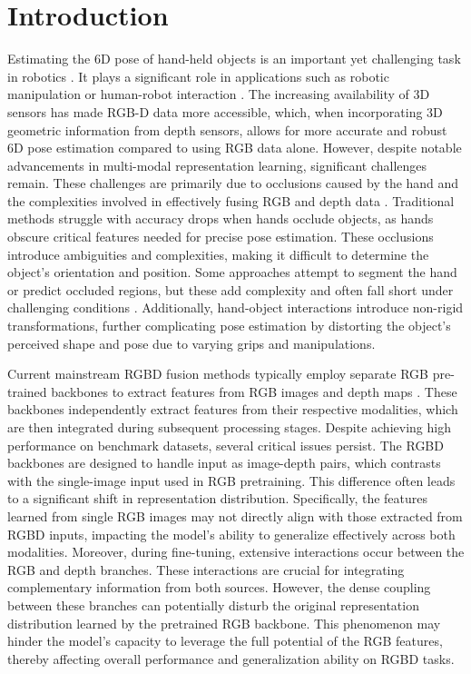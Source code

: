 \section{Introduction}
\label{sec:intro}

Estimating the 6D pose of hand-held objects is an important yet challenging task in robotics \cite{pfanne2018fusing, anzai2020deep}. It plays a significant role in applications such as robotic manipulation or human-robot interaction \cite{andrychowicz2020learning, handa2020dexpilot}. The increasing availability of 3D sensors has made RGB-D data more accessible, which, when incorporating 3D geometric information from depth sensors, allows for more accurate and robust 6D pose estimation compared to using RGB data alone. However, despite notable advancements in multi-modal representation learning, significant challenges remain. These challenges are primarily due to occlusions caused by the hand and the complexities involved in effectively fusing RGB and depth data \cite{chao2021dexycb}. Traditional methods \cite{wang20216d, peng2019pvnet, wang2019densefusion} struggle with accuracy drops when hands occlude objects, as hands obscure critical features needed for precise pose estimation. These occlusions introduce ambiguities and complexities, making it difficult to determine the object's orientation and position. Some approaches attempt to segment the hand or predict occluded regions, but these add complexity and often fall short under challenging conditions \cite{he2020pvn3d, castro2023crt}. Additionally, hand-object interactions introduce non-rigid transformations, further complicating pose estimation by distorting the object's perceived shape and pose due to varying grips and manipulations.

Current mainstream RGBD fusion methods typically employ separate RGB pre-trained backbones to extract features from RGB images and depth maps \cite{wang2019densefusion, he2020pvn3d, he2021ffb6d}. These backbones independently extract features from their respective modalities, which are then integrated during subsequent processing stages. Despite achieving high performance on benchmark datasets, several critical issues persist. The RGBD backbones are designed to handle input as image-depth pairs, which contrasts with the single-image input used in RGB pretraining. This difference often leads to a significant shift in representation distribution. Specifically, the features learned from single RGB images may not directly align with those extracted from RGBD inputs, impacting the model's ability to generalize effectively across both modalities. Moreover, during fine-tuning, extensive interactions occur between the RGB and depth branches. These interactions are crucial for integrating complementary information from both sources. However, the dense coupling between these branches can potentially disturb the original representation distribution learned by the pretrained RGB backbone. This phenomenon may hinder the model's capacity to leverage the full potential of the RGB features, thereby affecting overall performance and generalization ability on RGBD tasks.

